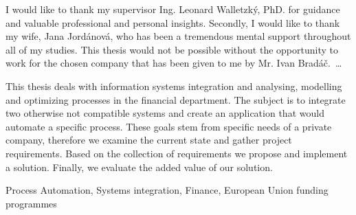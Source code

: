 \documentclass[12pt,oneside]{fithesis2}
\begin{document}
  \FrontMatter
    \ThesisTitlePage
    \begin{ThesisDeclaration}
      \DeclarationText
      \AdvisorName
    \end{ThesisDeclaration}
    \begin{ThesisThanks}
      I would like to thank my supervisor Ing. Leonard Walletzký, PhD. for guidance and valuable professional and personal insights. Secondly, I would like to thank my wife, Jana Jordánová, who has been a tremendous mental support throughout all of my studies. This thesis would not be possible without the opportunity to work for the chosen company that has been given to me by Mr. Ivan Bradáč. \,\dots
    \end{ThesisThanks}
    \begin{ThesisAbstract}
      This thesis deals with information systems integration and analysing, modelling and optimizing processes in the financial department. The subject is to integrate two otherwise not compatible systems and create an application that would automate a specific process. These goals stem from specific needs of a private company, therefore we examine the current state and gather project requirements. Based on the collection of requirements we propose and implement a solution. Finally, we evaluate the added value of our solution.
    \end{ThesisAbstract}
    \begin{ThesisKeyWords}Process Automation, Systems integration, Finance, European Union funding programmes
    \end{ThesisKeyWords}
    \tableofcontents
  
  \MainMatter
\end{document}
